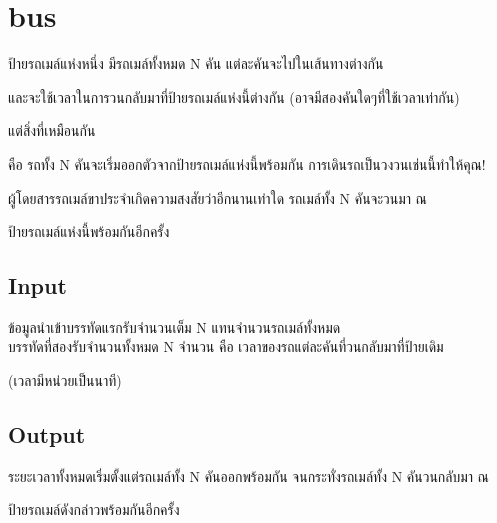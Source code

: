 \documentclass{article}
\begin{document}
\section*{bus}

ป้ายรถเมล์แห่งหนึ่ง มีรถเมล์ทั้งหมด N คัน แต่ละคันจะไปในเส้นทางต่างกัน

และจะใช้เวลาในการวนกลับมาที่ป้ายรถเมล์แห่งนี้ต่างกัน (อาจมีสองคันใดๆที่ใช้เวลาเท่ากัน)

แต่สิ่งที่เหมือนกัน



คือ รถทั้ง N คันจะเริ่มออกตัวจากป้ายรถเมล์แห่งนี้พร้อมกัน การเดินรถเป็นวงวนเช่นนี้ทำให้คุณ!

ผู้โดยสารรถเมล์ขาประจำเกิดความสงสัยว่าอีกนานเท่าใด รถเมล์ทั้ง N คันจะวนมา ณ

ป้ายรถเมล์แห่งนี้พร้อมกันอีกครั้ง



\subsection*{Input}
ข้อมูลนำเข้าบรรทัดแรกรับจำนวนเต็ม N แทนจำนวนรถเมล์ทั้งหมด\\



บรรทัดที่สองรับจำนวนทั้งหมด N จำนวน คือ เวลาของรถแต่ละคันที่วนกลับมาที่ป้ายเดิม

(เวลามีหน่วยเป็นนาที)



\subsection*{Output}
{ระยะเวลาทั้งหมดเริ่มตั้งแต่รถเมล์ทั้ง N คันออกพร้อมกัน จนกระทั่งรถเมล์ทั้ง N คันวนกลับมา ณ

ป้ายรถเมล์ดังกล่าวพร้อมกันอีกครั้ง}\\
\end{document}
